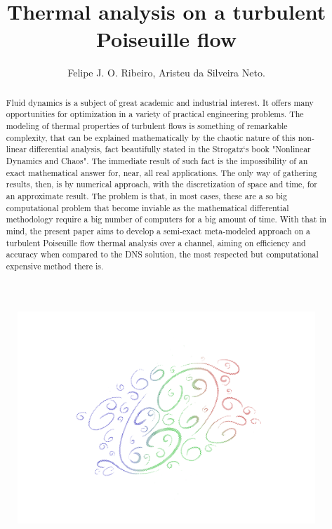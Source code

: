 \documentclass[10pt]{article} %
\title{ \loll Thermal analysis on a turbulent Poiseuille flow}
\author{Felipe J. O. Ribeiro, Aristeu da Silveira Neto.}
\begin{document}
\maketitle

\begin{figure}[h!]
	\centering
	\includegraphics[angle=0, trim={0 1cm 0 1cm},scale=0.70]{turbulence}
	\label{turbulence}
\end{figure}

\begin{abstract}
	\noindent Fluid dynamics is a subject of great academic and industrial interest. It offers many opportunities for optimization in a variety of practical engineering problems. The modeling of thermal properties of turbulent flows is something of remarkable complexity, that can be explained mathematically by the chaotic nature of this non-linear differential analysis, fact beautifully stated in the Strogatz`s book "Nonlinear Dynamics and Chaos". The immediate result of such fact is the impossibility of an exact mathematical answer for, near, all real applications. The only way of gathering results, then, is by numerical approach, with the discretization of space and time, for an approximate result. The problem is that, in most cases, these are a so big computational problem that become inviable as the mathematical differential methodology require a big number of computers for a big amount of time. With that in mind, the present paper aims to develop a semi-exact meta-modeled approach on a turbulent Poiseuille flow thermal analysis over a channel, aiming on efficiency and accuracy when compared to the DNS solution, the most respected but computational expensive method there is. 
\end{abstract}
\end{document}
